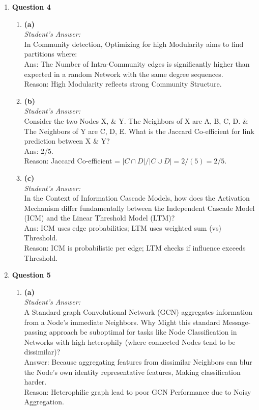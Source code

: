 \documentclass[a4paper,12pt]{article}
\begin{document}
\begin{enumerate}
    \item \textbf{Question 4}
    \begin{enumerate}
        \item \textbf{(a)} \\
        \textit{Student's Answer:} \\
        In Community detection, Optimizing for high Modularity aims to find partitions where: \\
        Ans: The Number of Intra-Community edges is significantly higher than expected in a random Network with the same degree sequences. \\
        Reason: High Modularity reflects strong Community Structure.

        \item \textbf{(b)} \\
        \textit{Student's Answer:} \\
        Consider the two Nodes X, \& Y. The Neighbors of X are A, B, C, D. \& The Neighbors of Y are C, D, E. What is the Jaccard Co-efficient for link prediction between X \& Y? \\
        Ans: 2/5. \\
        Reason: Jaccard Co-efficient = $|C \cap D| / |C \cup D| = 2 / (5) = 2/5$.

        \item \textbf{(c)} \\
        \textit{Student's Answer:} \\
        In the Context of Information Cascade Models, how does the Activation Mechanism differ fundamentally between the Independent Cascade Model (ICM) and the Linear Threshold Model (LTM)? \\
        Ans: ICM uses edge probabilities; LTM uses weighted sum (vs) Threshold. \\
        Reason: ICM is probabilistic per edge; LTM checks if influence exceeds Threshold.
    \end{enumerate}

    \item \textbf{Question 5}
    \begin{enumerate}
        \item \textbf{(a)} \\
        \textit{Student's Answer:} \\
        A Standard graph Convolutional Network (GCN) aggregates information from a Node's immediate Neighbors. Why Might this standard Message-passing approach be suboptimal for tasks like Node Classification in Networks with high heterophily (where connected Nodes tend to be dissimilar)? \\
        Answer: Because aggregating features from dissimilar Neighbors can blur the Node's own identity representative features, Making classification harder. \\
        Reason: Heterophilic graph lead to poor GCN Performance due to Noisy Aggregation.


\end{enumerate}
\end{enumerate}
\end{document}
